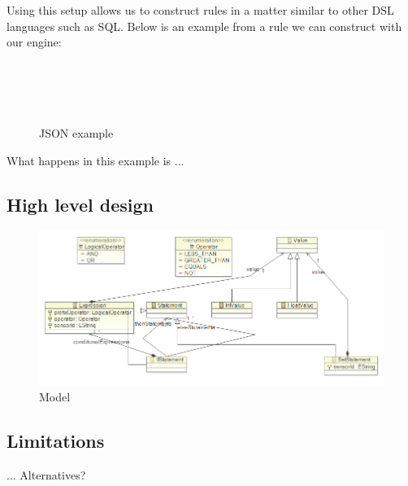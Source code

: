 Using this setup allows us to construct rules in a matter similar to other DSL languages such as SQL. Below is an example from a rule we can construct with our engine:
\\
\\
\\
\\
\\
%
%
%


\begin{figure}[t]
%

\caption{JSON example\label{json-example}}
\end{figure}


What happens in this example is ...

\subsection{High level design}
\begin{figure}[t]
\includegraphics[width=1.00\columnwidth]{model.png}
\caption{Model}
\end{figure}


\subsection{Limitations}
... Alternatives?
